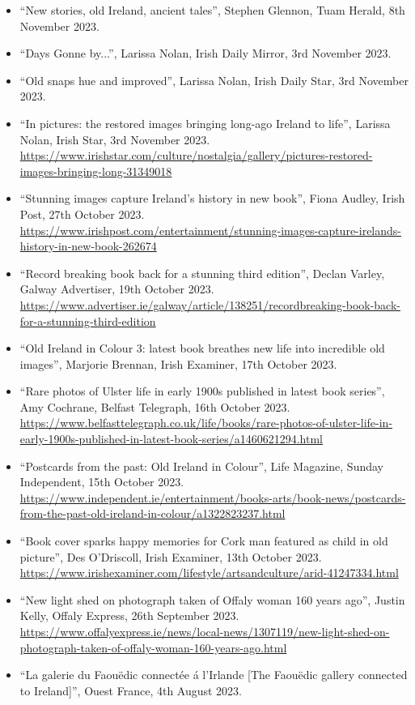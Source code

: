 \documentclass[10pt,a4paper]{res} %
\begin{document}
\begin{resume}
{\begin{itemize}
\item ``New stories, old Ireland, ancient tales'', Stephen Glennon, Tuam Herald, 8th November 2023.
\item ``Days Gonne by...'', Larissa Nolan, Irish Daily Mirror, 3rd November 2023.
\item ``Old snaps hue and improved'', Larissa Nolan, Irish Daily Star, 3rd November 2023.
\item ``In pictures: the restored images bringing long-ago Ireland to life'', Larissa Nolan, Irish Star, 3rd November 2023. \url{https://www.irishstar.com/culture/nostalgia/gallery/pictures-restored-images-bringing-long-31349018}
\item ``Stunning images capture Ireland's history in new book'', Fiona Audley, Irish Post, 27th October 2023. \url{https://www.irishpost.com/entertainment/stunning-images-capture-irelands-history-in-new-book-262674}
\item ``Record breaking book back for a stunning third edition'', Declan Varley, Galway Advertiser, 19th October 2023. \url{https://www.advertiser.ie/galway/article/138251/recordbreaking-book-back-for-a-stunning-third-edition}
\item ``Old Ireland in Colour 3: latest book breathes new life into incredible old images'', Marjorie Brennan, Irish Examiner, 17th October 2023.
\item ``Rare photos of Ulster life in early 1900s published in latest book series'', Amy Cochrane, Belfast Telegraph, 16th October 2023. \url{https://www.belfasttelegraph.co.uk/life/books/rare-photos-of-ulster-life-in-early-1900s-published-in-latest-book-series/a1460621294.html}
\item ``Postcards from the past: Old Ireland in Colour'', Life Magazine, Sunday Independent, 15th October 2023. \url{https://www.independent.ie/entertainment/books-arts/book-news/postcards-from-the-past-old-ireland-in-colour/a1322823237.html}
\item ``Book cover sparks happy memories for Cork man featured as child in old picture'', Des O'Driscoll, Irish Examiner, 13th October 2023. \url{https://www.irishexaminer.com/lifestyle/artsandculture/arid-41247334.html}
\item ``New light shed on photograph taken of Offaly woman 160 years ago'', Justin Kelly, Offaly Express, 26th September 2023. \url{https://www.offalyexpress.ie/news/local-news/1307119/new-light-shed-on-photograph-taken-of-offaly-woman-160-years-ago.html}
\item ``La gale­rie du Faou\"{e}dic connec­t\'{e}e \'{a} l'Irlande [The Faou\"{e}dic gallery connected to Ireland]'', Ouest France, 4th August 2023.

\end{itemize}}
\end{resume}
\end{document}
